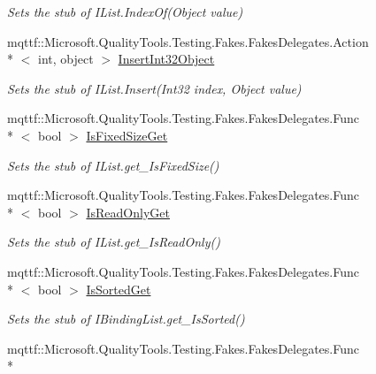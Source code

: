 \begin{DoxyCompactItemize}
\begin{DoxyCompactList}\small\item\em Sets the stub of I\-List.\-Index\-Of(\-Object value)\end{DoxyCompactList}\item 
mqttf\-::\-Microsoft.\-Quality\-Tools.\-Testing.\-Fakes.\-Fakes\-Delegates.\-Action\\*
$<$ int, object $>$ \hyperlink{class_system_1_1_component_model_1_1_fakes_1_1_stub_i_binding_list_a9d9bd165683014f31f1635d83b4048e5}{Insert\-Int32\-Object}
\begin{DoxyCompactList}\small\item\em Sets the stub of I\-List.\-Insert(\-Int32 index, Object value)\end{DoxyCompactList}\item 
mqttf\-::\-Microsoft.\-Quality\-Tools.\-Testing.\-Fakes.\-Fakes\-Delegates.\-Func\\*
$<$ bool $>$ \hyperlink{class_system_1_1_component_model_1_1_fakes_1_1_stub_i_binding_list_a9e2c181a55f6ab777c8bce4ae90bd002}{Is\-Fixed\-Size\-Get}
\begin{DoxyCompactList}\small\item\em Sets the stub of I\-List.\-get\-\_\-\-Is\-Fixed\-Size()\end{DoxyCompactList}\item 
mqttf\-::\-Microsoft.\-Quality\-Tools.\-Testing.\-Fakes.\-Fakes\-Delegates.\-Func\\*
$<$ bool $>$ \hyperlink{class_system_1_1_component_model_1_1_fakes_1_1_stub_i_binding_list_a6f23042591f8825f59e3b5e017ff2492}{Is\-Read\-Only\-Get}
\begin{DoxyCompactList}\small\item\em Sets the stub of I\-List.\-get\-\_\-\-Is\-Read\-Only()\end{DoxyCompactList}\item 
mqttf\-::\-Microsoft.\-Quality\-Tools.\-Testing.\-Fakes.\-Fakes\-Delegates.\-Func\\*
$<$ bool $>$ \hyperlink{class_system_1_1_component_model_1_1_fakes_1_1_stub_i_binding_list_a1b59125b4788252979ffd1b1e35eb085}{Is\-Sorted\-Get}
\begin{DoxyCompactList}\small\item\em Sets the stub of I\-Binding\-List.\-get\-\_\-\-Is\-Sorted()\end{DoxyCompactList}\item 
mqttf\-::\-Microsoft.\-Quality\-Tools.\-Testing.\-Fakes.\-Fakes\-Delegates.\-Func\\*

\end{DoxyCompactItemize}
